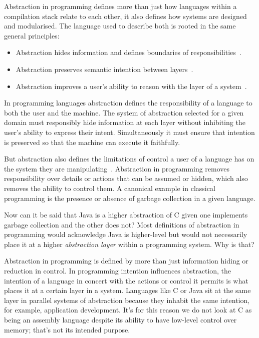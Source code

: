 Abstraction in programming defines more than just how languages within a compilation stack relate to each other, it also defines how systems are designed and modularised.
The language used to describe both is rooted in the same general principles:
\begin{itemize}
    \item Abstraction hides information and defines boundaries of responsibilities~\cite{parnas1972criteria}.
    \item Abstraction preserves semantic intention between layers~\cite{yuan2025foundationalabstractions}.
    \item Abstraction improves a user's ability to reason with the layer of a system~\cite{DiMatteo2024AbstractionHierarchy}.
\end{itemize}

In programming languages abstraction defines the responsibility of a language to both the user and the machine.
The system of abstraction selected for a given domain must responsibly hide information at each layer without inhibiting the user's ability to express their intent.
Simultaneously it must ensure that intention is preserved so that the machine can execute it faithfully.

But abstraction also defines the limitations of control a user of a language has on the system they are manipulating~\cite{yuan2025foundationalabstractions}.
Abstraction in programming removes responsibility over details or actions that can be assumed or hidden, which also removes the ability to control them.
A canonical example in classical programming is the presence or absence of garbage collection in a given language.

Now can it be said that Java is a higher abstraction of C given one implements garbage collection and the other does not?
Most definitions of abstraction in programming would acknowledge Java is higher-level but would not necessarily place it at a higher \textit{abstraction layer} within a programming system.
Why is that?

Abstraction in programming is defined by more than just information hiding or reduction in control.
In programming intention influences abstraction, the intention of a language in concert with the actions or control it permits is what places it at a certain layer in a system.
Languages like C or Java sit at the same layer in parallel systems of abstraction because they inhabit the same intention, for example, application development.
It's for this reason we do not look at C as being an assembly language despite its ability to have low-level control over memory; that's not its intended purpose.

